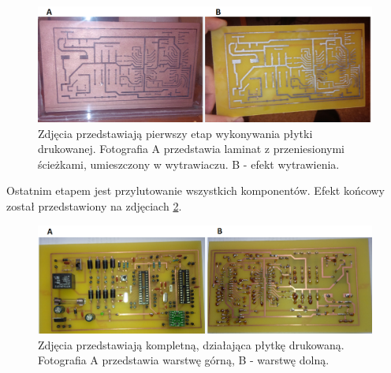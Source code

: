    \begin{figure}[H]
    \begin{center}
      \includegraphics[scale=0.47]{imgs/plytka_trawienie.png}
 	\caption[Proces trawienia.]{\small{Zdjęcia przedstawiają pierwszy etap wykonywania płytki drukowanej. Fotografia A przedstawia laminat z przeniesionymi ścieżkami, umieszczony w wytrawiaczu. B - efekt wytrawienia.}}
	\label{trwa}
    \end{center}
  \end{figure}  
  
  Ostatnim etapem jest przylutowanie wszystkich komponentów. Efekt końcowy został przedstawiony na zdjęciach \ref{ost_ef}.
  
  \begin{figure}[H]
    \begin{center}
      \includegraphics[scale=0.45]{imgs/efekt.png}
 	\caption[Wykonanie płytki drukowanej.]{\small{Zdjęcia przedstawiają kompletną, działająca płytkę drukowaną. Fotografia A przedstawia warstwę górną, B - warstwę dolną.}}
	\label{ost_ef}
    \end{center}
  \end{figure}  